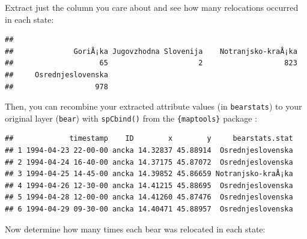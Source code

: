 \documentclass[]{book}
\newenvironment{Shaded}{\begin{snugshade}}{\end{snugshade}}
\newcommand{\KeywordTok}[1]{\textcolor[rgb]{0.13,0.29,0.53}{\textbf{#1}}}
\newcommand{\DataTypeTok}[1]{\textcolor[rgb]{0.13,0.29,0.53}{#1}}
\newcommand{\DecValTok}[1]{\textcolor[rgb]{0.00,0.00,0.81}{#1}}
\newcommand{\StringTok}[1]{\textcolor[rgb]{0.31,0.60,0.02}{#1}}
\newcommand{\OperatorTok}[1]{\textcolor[rgb]{0.81,0.36,0.00}{\textbf{#1}}}
\newcommand{\NormalTok}[1]{#1}
\theoremstyle{definition}
\theoremstyle{definition}
\theoremstyle{definition}
\theoremstyle{remark}
\begin{document}
Extract just the column you care about and see how many relocations
occurred in each state:

\begin{Shaded}
\end{Shaded}

\begin{verbatim}
## 
##              GoriÅ¡ka Jugovzhodna Slovenija    Notranjsko-kraÅ¡ka 
##                    65                     2                   823 
##     Osrednjeslovenska 
##                   978
\end{verbatim}

Then, you can recombine your extracted attribute values (in
\texttt{bearstats}) to your original layer (\texttt{bear}) with
\texttt{spCbind()} from the \texttt{\{maptools\}} package
\citep{R-maptools}:

\begin{Shaded}
\end{Shaded}

\begin{verbatim}
##             timestamp    ID        x        y     bearstats.stat
## 1 1994-04-23 22-00-00 ancka 14.32837 45.88914  Osrednjeslovenska
## 2 1994-04-24 16-40-00 ancka 14.37175 45.87072  Osrednjeslovenska
## 3 1994-04-25 14-45-00 ancka 14.39852 45.86659 Notranjsko-kraÅ¡ka
## 4 1994-04-26 12-30-00 ancka 14.41215 45.88695  Osrednjeslovenska
## 5 1994-04-28 12-00-00 ancka 14.41260 45.87476  Osrednjeslovenska
## 6 1994-04-29 09-30-00 ancka 14.40471 45.88957  Osrednjeslovenska
\end{verbatim}

Now determine how many times each bear was relocated in each state:

\begin{Shaded}
\end{Shaded}
\end{document}

